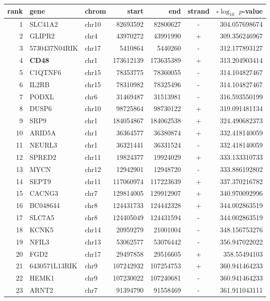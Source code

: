 \begin{table}
\small \centering 
 \begin{tabular}{rllrrcr}
rank & gene & chrom & start & end & strand & -$\log_{10}$ $p$-value \\\hline
1 & SLC41A2 & chr10 & 82693592 & 82800627 & - & 304.057698674 \\
2 & GLIPR2 & chr4 & 43970272 & 43991990 & + & 309.356246967 \\
3 & 5730437N04RIK & chr17 & 5410864 & 5440260 & - & 312.177893127 \\
4 & \textbf{CD48} & chr1 & 173612139 & 173635389 & + & 313.204903414 \\
5 & C1QTNF6 & chr15 & 78353775 & 78360055 & - & 314.104827467 \\
6 & IL2RB & chr15 & 78310982 & 78325496 & - & 314.104827467 \\
7 & PODXL & chr6 & 31469487 & 31513981 & - & 316.593550199 \\
8 & DUSP6 & chr10 & 98725864 & 98730122 & + & 319.091481134 \\
9 & SRP9 & chr1 & 184054867 & 184062538 & + & 324.490682373 \\
10 & ARID5A & chr1 & 36364577 & 36380874 & + & 332.418140059 \\
11 & NEURL3 & chr1 & 36321441 & 36331524 & - & 332.418140059 \\
12 & SPRED2 & chr11 & 19824377 & 19924029 & + & 333.133310733 \\
13 & MYCN & chr12 & 12942901 & 12948720 & - & 333.886192802 \\
14 & SEPT9 & chr11 & 117060974 & 117223639 & + & 337.370216782 \\
15 & CACNG3 & chr7 & 129814005 & 129912907 & + & 340.970092996 \\
16 & BC048644 & chr8 & 124431733 & 124442328 & + & 344.002863519 \\
17 & SLC7A5 & chr8 & 124405049 & 124431594 & - & 344.002863519 \\
18 & KCNK5 & chr14 & 20959279 & 21001004 & - & 348.156753276 \\
19 & NFIL3 & chr13 & 53062577 & 53076442 & - & 356.947022022 \\
20 & FGD2 & chr17 & 29497858 & 29516605 & + & 358.55494103 \\
21 & 6430571L13RIK & chr9 & 107242932 & 107254753 & + & 360.941464233 \\
22 & HEMK1 & chr9 & 107230022 & 107240681 & - & 360.941464233 \\
23 & ARNT2 & chr7 & 91394790 & 91558469 & - & 361.911043111 \\

\end{tabular}
\end{table}
